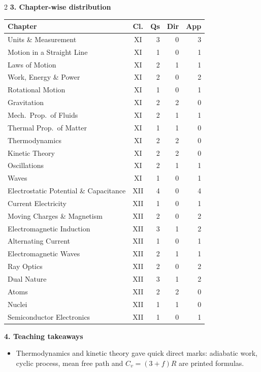 \begin{multicols}{2}
\columnbreak
\textbf{\color{crimson}3. Chapter-wise distribution}\par\smallskip
{\footnotesize\begin{tabular}{@{}p{4.7cm}c@{\,}r@{\,}r@{\,}r@{}}\toprule
Chapter & Cl. & Qs & Dir & App\\\midrule
Units \& Measurement & XI & 3 & 0 & 3\\
Motion in a Straight Line & XI & 1 & 0 & 1\\
Laws of Motion & XI & 2 & 1 & 1\\
Work, Energy \& Power & XI & 2 & 0 & 2\\
Rotational Motion & XI & 1 & 0 & 1\\
Gravitation & XI & 2 & 2 & 0\\
Mech.\ Prop.\ of Fluids & XI & 2 & 1 & 1\\
Thermal Prop.\ of Matter & XI & 1 & 1 & 0\\
Thermodynamics & XI & 2 & 2 & 0\\
Kinetic Theory & XI & 2 & 2 & 0\\
Oscillations & XI & 2 & 1 & 1\\
Waves & XI & 1 & 0 & 1\\
Electrostatic Potential \& Capacitance & XII & 4 & 0 & 4\\
Current Electricity & XII & 1 & 0 & 1\\
Moving Charges \& Magnetism & XII & 2 & 0 & 2\\
Electromagnetic Induction & XII & 3 & 1 & 2\\
Alternating Current & XII & 1 & 0 & 1\\
Electromagnetic Waves & XII & 2 & 1 & 1\\
Ray Optics & XII & 2 & 0 & 2\\
Dual Nature & XII & 3 & 1 & 2\\
Atoms & XII & 2 & 2 & 0\\
Nuclei & XII & 1 & 1 & 0\\
Semiconductor Electronics & XII & 1 & 0 & 1\\
\bottomrule\end{tabular}}\par\medskip
\textbf{\color{crimson}4. Teaching takeaways}\par\smallskip
{\footnotesize\begin{itemize}[leftmargin=1em,nosep]
\item Thermodynamics and kinetic theory gave quick direct marks: adiabatic work, cyclic process, mean free path and $C_v=(3+f)R$ are printed formulas.

\end{itemize}}
\end{multicols}

